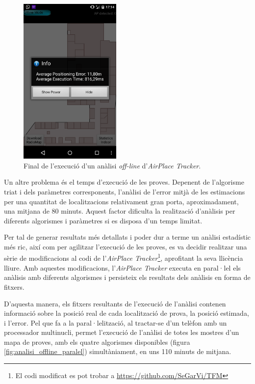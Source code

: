 \begin{figure}[ht]
\begin{center}
\includegraphics[width=5cm]{imatges/analisi_offline_defecte.png}
\caption{Final de l'execució d'un anàlisi \textit{off-line} d'\textit{AirPlace Tracker}.}
\label{fig:analisi_offline_defecte}
\end{center}
\end{figure}

Un altre problema és el temps d'execució de les proves. Depenent de l'algorisme triat i dels paràmetres corresponents, l'anàlisi de l'error mitjà de les estimacions per una quantitat de localitzacions relativament gran porta, aproximadament, una mitjana de 80 minuts. Aquest factor dificulta la realització d'anàlisis per diferents algorismes i paràmetres si es disposa d'un temps limitat.

Per tal de generar resultats més detallats i poder dur a terme un anàlisi estadístic més ric, així com per agilitzar l'execució de les proves, es va decidir realitzar una sèrie de modificacions al codi de l'\textit{AirPlace Tracker}\footnote{El codi modificat es pot trobar a \url{https://github.com/SeGarVi/TFM}}, aprofitant la seva llicència lliure. Amb aquestes modificacions, l'\textit{AirPlace Tracker} executa en paral·lel els anàlisis amb diferents algorismes i persisteix els resultats dels anàlisis en forma de fitxers.

D'aquesta manera, els fitxers resultants de l'execució de l'anàlisi contenen informació sobre la posició real de cada localització de prova, la posició estimada, i l'error. Pel que fa a la paral·lelització, al tractar-se d'un telèfon amb un processador multinucli, permet l'execució de l'anàlisi de totes les mostres d'un mapa de proves, amb els quatre algorismes disponibles (figura \ref{fig:analisi_offline_paralel}) simultàniament, en uns 110 minuts de mitjana.

